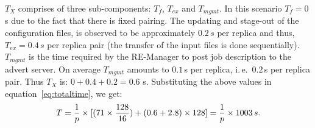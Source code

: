 \documentclass{rspublic}
\newcommand{\jhanote}[1]{ {\textcolor{red} { ***shantenu: #1 }}}
\newcommand{\alnote}[1]{ {\textcolor{blue} { ***andre: #1 }}}
\newcommand{\athotanote}[1]{ {\textcolor{green} { ***athota: #1 }}}
\newcommand{\alnote}[1]{}
\newcommand{\athotanote}[1]{}
\newcommand{\jhanote}[1]{}
\begin{document}

$T_{X}$ comprises of three sub-components: $T_f$, $T_{ex}$ and
$T_{mgmt}$. In this scenario $T_{f}=0$\,s due to the fact that there
is fixed pairing. The updating and stage-out of the configuration
files, is observed to be approximately $0.2\,s$ per replica and thus,
$T_{ex} = 0.4\,s$ per replica pair (the transfer of the input files is
done sequentially). 
$T_{mgmt}$ is the time required by the RE-Manager to post job
description to the advert server. On average $T_{mgmt}$ amounts to
$0.1$\,s per replica, i.\,e.\ $0.2$\,s per replica pair.
Thus $T_{X}$ is: $0+0.4+0.2=0.6$ s. Substituting the above values in
equation~\ref{eq:totaltime}, we get:
\begin{eqnarray}
  T=  {1 \over p} \times {[ {(71\times {128\over 16}})+ (0.6 + 2.8)\times 128]} = {1 \over p} \times 1003\,s.
  \label{eq:sync}
\end{eqnarray}




\end{document}
